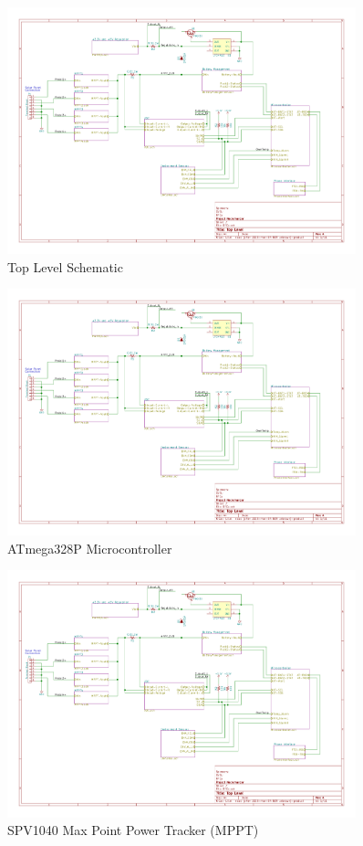 \documentclass{article}
\numberwithin{figure}{section}
\numberwithin{equation}{section}
\begin{document}
{%
\begin{figure}[H]
	\centering
	\includegraphics[page=1,width=0.9\textwidth]{RFCxSchematics.pdf}
	\caption{Top Level Schematic}
	\label{fig:schemp1}
\end{figure}

\begin{figure}[H]
	\centering
	\includegraphics[page=2,width=0.9\textwidth]{RFCxSchematics.pdf}
	\caption{ATmega328P Microcontroller}
	\label{fig:schemp2}
\end{figure}

\begin{figure}[H]
	\centering
	\includegraphics[page=3,width=0.9\textwidth]{RFCxSchematics.pdf}
	\caption{SPV1040 Max Point Power Tracker (MPPT)}
	\label{fig:schemp3}
\end{figure}

}
\end{document}
